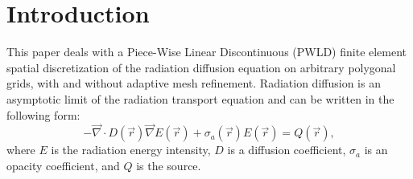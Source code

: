 \documentclass[preprint,10pt]{elsarticle}
\renewcommand{\div}{\vec{\nabla}\! \cdot \!}
\newcommand{\grad}{\vec{\nabla}}
\newcommand{\vr}{\vec{r}}
\newcommand{\tcr}[1]{\textcolor{red}{#1}}
\begin{document}
\linenumbers

\section{Introduction} \label{sec:intro}


This paper deals with a Piece-Wise Linear Discontinuous (PWLD) finite element spatial discretization of 
the radiation diffusion equation on arbitrary polygonal grids, with and without adaptive mesh refinement. 
Radiation diffusion is an asymptotic limit of the radiation transport equation and can be 
written in the following form:
\begin{equation} \label{eq:radiation_diffusion}
- \div  D(\vr) \grad E(\vr) + \sigma_a(\vr) E(\vr) = Q(\vr) ,
\end{equation}
where $E$ is the radiation energy intensity, $D$ is a diffusion coefficient, $\sigma_a$ is 
an opacity coefficient, and $Q$ is the source.
\end{document}
